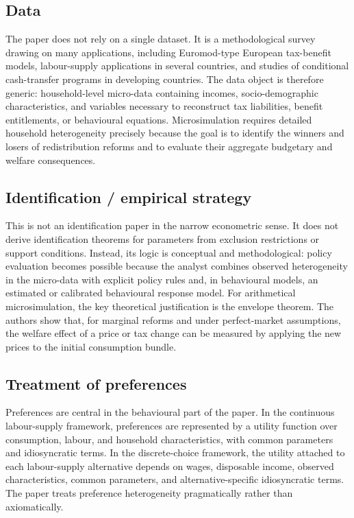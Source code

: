 \documentclass[11pt,a4paper]{article}
\begin{document}
\subsection*{Data}
The paper does not rely on a single dataset. It is a methodological survey drawing on many applications, including Euromod-type European tax-benefit models, labour-supply applications in several countries, and studies of conditional cash-transfer programs in developing countries. The data object is therefore generic: household-level micro-data containing incomes, socio-demographic characteristics, and variables necessary to reconstruct tax liabilities, benefit entitlements, or behavioural equations. Microsimulation requires detailed household heterogeneity precisely because the goal is to identify the winners and losers of redistribution reforms and to evaluate their aggregate budgetary and welfare consequences.

\subsection*{Identification / empirical strategy}
This is not an identification paper in the narrow econometric sense. It does not derive identification theorems for parameters from exclusion restrictions or support conditions. Instead, its logic is conceptual and methodological: policy evaluation becomes possible because the analyst combines observed heterogeneity in the micro-data with explicit policy rules and, in behavioural models, an estimated or calibrated behavioural response model. For arithmetical microsimulation, the key theoretical justification is the envelope theorem. The authors show that, for marginal reforms and under perfect-market assumptions, the welfare effect of a price or tax change can be measured by applying the new prices to the initial consumption bundle.

\subsection*{Treatment of preferences}
Preferences are central in the behavioural part of the paper. In the continuous labour-supply framework, preferences are represented by a utility function over consumption, labour, and household characteristics, with common parameters and idiosyncratic terms. In the discrete-choice framework, the utility attached to each labour-supply alternative depends on wages, disposable income, observed characteristics, common parameters, and alternative-specific idiosyncratic terms. The paper treats preference heterogeneity pragmatically rather than axiomatically.
\end{document}
